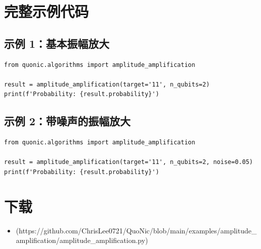 \documentclass[12pt,a4paper]{article}
\begin{document}
\section{完整示例代码}

\subsection{示例 1：基本振幅放大}

\begin{verbatim}
from quonic.algorithms import amplitude_amplification

result = amplitude_amplification(target='11', n_qubits=2)
print(f'Probability: {result.probability}')
\end{verbatim}

\subsection{示例 2：带噪声的振幅放大}

\begin{verbatim}
from quonic.algorithms import amplitude_amplification

result = amplitude_amplification(target='11', n_qubits=2, noise=0.05)
print(f'Probability: {result.probability}')
\end{verbatim}

\section{下载}

\begin{itemize}
  \item [amplitude\_amplification.py](https://github.com/ChrisLee0721/QuoNic/blob/main/examples/amplitude_amplification/amplitude_amplification.py)
\end{itemize}
\end{document}
